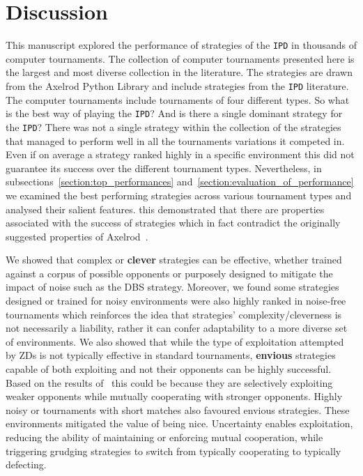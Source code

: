 \documentclass{article}
\newcommand{\numberofstrategies}{}
\def\IPD{\texttt{IPD}}
\begin{document}
\section{Discussion}\label{section:conclusion}

This manuscript explored the performance of \numberofstrategies strategies of
the \IPD{} in thousands of computer tournaments. The collection of computer
tournaments presented here is the largest and most diverse collection in the
literature. The \numberofstrategies strategies are drawn from the Axelrod Python Library and
include strategies from the \IPD{} literature. The computer tournaments include
tournaments of four different types. So what is the best way of playing the
\IPD{}? And is there a single dominant strategy for the \IPD{}? There was not a
single strategy within the collection of the \numberofstrategies strategies that
managed to perform well in all the tournaments variations it competed in. Even
if on average a strategy ranked highly in a specific environment this did not
guarantee its success over the different tournament types. Nevertheless, in
subsections~\ref{section:top_performances}
and~\ref{section:evaluation_of_performance} we examined the best performing
strategies across various tournament types and analysed their salient features.
this demonstrated that there are properties associated with the success of
strategies which in fact contradict the originally suggested properties of
Axelrod~\cite{Axelrod1981}.

We showed that complex or \textbf{clever} strategies can be effective, whether
trained against a corpus of possible opponents or purposely designed to mitigate
the impact of noise such as the DBS strategy. Moreover, we found some
strategies designed or trained for noisy environments were also highly ranked in
noise-free tournaments which reinforces the idea that strategies'
complexity/cleverness is not necessarily a liability, rather it can confer
adaptability to a more diverse set of environments.
We also showed that while the type of exploitation attempted by ZDs is
not typically effective in standard tournaments, \textbf{envious} strategies
capable of both exploiting and not their opponents can be highly successful.
Based on the results of~\cite{Harper2017} this could be because they are
selectively exploiting weaker opponents while mutually cooperating with stronger
opponents. Highly noisy or tournaments with short matches also favoured envious
strategies. These environments mitigated the value of being nice. Uncertainty
enables exploitation, reducing the ability of maintaining or enforcing mutual
cooperation, while triggering grudging strategies to switch from typically
cooperating to typically defecting.
\end{document}
